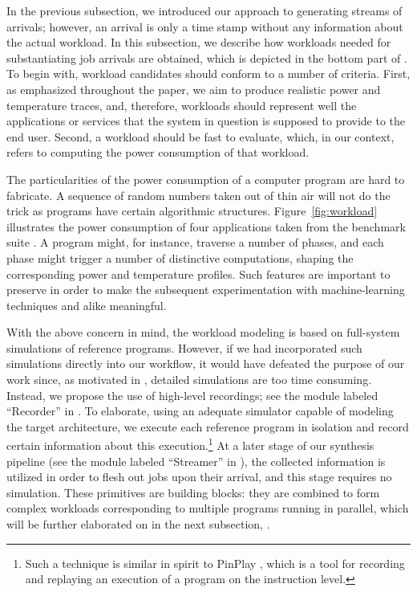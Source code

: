 
In the previous subsection, we introduced our approach to generating streams of
arrivals; however, an arrival is only a time stamp without any information about
the actual workload. In this subsection, we describe how workloads needed for
substantiating job arrivals are obtained, which is depicted in the bottom part
of . To begin with, workload candidates should conform to a
number of criteria. First, as emphasized throughout the paper, we aim to produce
realistic power and temperature traces, and, therefore, workloads should
represent well the applications or services that the system in question is
supposed to provide to the end user. Second, a workload should be fast to
evaluate, which, in our context, refers to computing the power consumption of
that workload.

The particularities of the power consumption of a computer program are hard to
fabricate. A sequence of random numbers taken out of thin air will not do the
trick as programs have certain algorithmic structures.
Figure~\ref{fig:workload} illustrates the power consumption of four applications
taken from the  benchmark suite \cite{cpu2006}. A program
might, for instance, traverse a number of phases, and each phase might trigger a
number of distinctive computations, shaping the corresponding power and
temperature profiles. Such features are important to preserve in order to make
the subsequent experimentation with machine-learning techniques and alike
meaningful.

With the above concern in mind, the workload modeling is based on full-system
simulations of reference programs. However, if we had incorporated such
simulations directly into our workflow, it would have defeated the purpose of
our work since, as motivated in , detailed simulations are too
time consuming. Instead, we propose the use of high-level recordings; see the
module labeled ``Recorder'' in . To elaborate, using an
adequate simulator capable of modeling the target architecture, we execute each
reference program in isolation and record certain information about this
execution.\footnote{Such a technique is similar in spirit to PinPlay
\cite{patil2010}, which is a tool for recording and replaying an execution of a
program on the instruction level.} At a later stage of our synthesis pipeline
(see the module labeled ``Streamer'' in ), the collected
information is utilized in order to flesh out jobs upon their arrival, and this
stage requires no simulation. These primitives are building blocks: they are
combined to form complex workloads corresponding to multiple programs running in
parallel, which will be further elaborated on in the next subsection,
.

